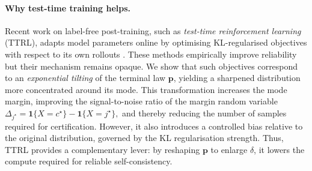 \documentclass{article} %
\begin{document}
\paragraph{Why test-time training helps.}
Recent work on label-free post-training, such as \emph{test-time reinforcement learning} (TTRL), adapts model parameters online by optimising KL-regularised objectives with respect to its own rollouts \citep{zuo2025ttrl,akyurek2025ttt}. 
These methods empirically improve reliability but their mechanism remains opaque. 
We show that such objectives correspond to an \emph{exponential tilting} of the terminal law $\mathbf p$, yielding a sharpened distribution more concentrated around its mode. 
This transformation increases the mode margin, improving the signal-to-noise ratio of the margin random variable 
\(
\Delta_{j^\star} = \mathbf{1}\{X=c^\star\}-\mathbf{1}\{X=j^\star\},
\)
and thereby reducing the number of samples required for certification. 
However, it also introduces a controlled bias relative to the original distribution, governed by the KL regularisation strength. 
Thus, TTRL provides a complementary lever: by reshaping $\mathbf p$ to enlarge $\delta$, it lowers the compute required for reliable self-consistency.
\end{document}
